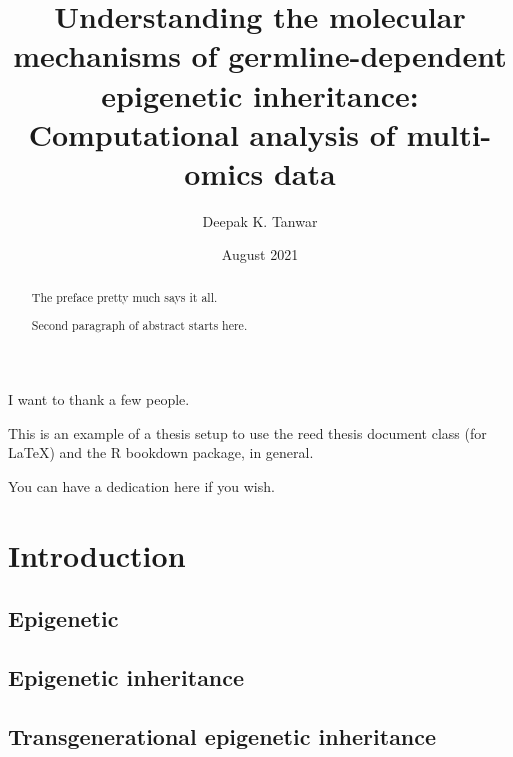 \documentclass[12pt,twoside]{reedthesis}
\title{Understanding the molecular mechanisms of germline-dependent epigenetic inheritance: Computational analysis of multi-omics data}
\author{Deepak K. Tanwar}
\date{August 2021}
\begin{document}
  \maketitle

\frontmatter %
\pagestyle{empty} %
  \begin{acknowledgements}
    I want to thank a few people.
  \end{acknowledgements}
  \begin{preface}
    This is an example of a thesis setup to use the reed thesis document class
    (for LaTeX) and the R bookdown package, in general.
  \end{preface}
  \hypersetup{linkcolor=black}
  \setcounter{tocdepth}{2}
  \tableofcontents

  \listoftables

  \listoffigures
  \begin{abstract}
    The preface pretty much says it all.
    
    \par
    
    Second paragraph of abstract starts here.
  \end{abstract}
  \begin{dedication}
    You can have a dedication here if you wish.
  \end{dedication}
\mainmatter %
\pagestyle{fancyplain} %

\hypertarget{introduction}{%
\chapter{Introduction}\label{introduction}}

\hypertarget{epigenetic}{%
\section{Epigenetic}\label{epigenetic}}

\hypertarget{epigenetic-inheritance}{%
\section{Epigenetic inheritance}\label{epigenetic-inheritance}}

\hypertarget{transgenerational-epigenetic-inheritance}{%
\section{Transgenerational epigenetic inheritance}\label{transgenerational-epigenetic-inheritance}}
\end{document}
